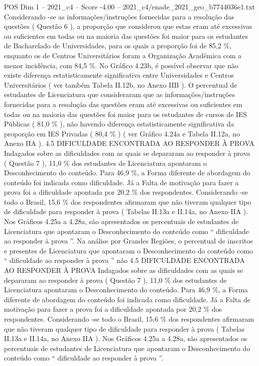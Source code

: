 \begin{textsample}{POS Dim 1 – 2021\_c4 – Score -4.00 – 2021\_c4/enade\_2021\_geo\_b7744036e1.txt}
Considerando -se as informações/instruções fornecidas para a resolução das questões ( Questão 6 ), a proporção que considerou que estas eram até excessivas ou suficientes em todas ou na maioria das questões foi maior para os estudantes de Bacharelado de Universidades, para os quais a proporção foi de 85,2 \%, enquanto os de Centros Universitários foram a Organização Acadêmica com a menor incidência, com 84,5 \%.
No Gráfico 4.23b, é possível observar que não existe diferença estatisticamente significativa entre Universidades e Centros Universitários ( ver também Tabela II.12b, no Anexo IIB ).
O percentual de estudantes de Licenciatura que consideraram que as informações/instruções fornecidas para a resolução das questões eram até excessivas ou suficientes em todas ou na maioria das questões foi maior para os estudantes de cursos de IES Públicas ( 81,0 \% ), não havendo diferença estatisticamente significativa da proporção em IES Privadas ( 80,4 \% ) ( ver Gráfico 4.24a e Tabela II.12a, no Anexo IIA ). 4.5 DIFICULDADE ENCONTRADA AO RESPONDER À PROVA Indagados sobre as dificuldades com as quais se depararam ao responder à prova ( Questão 7 ), 11,0 \% dos estudantes de Licenciatura apontaram o Desconhecimento do conteúdo.
Para 46,9 \%, a Forma diferente de abordagem do conteúdo foi indicada como dificuldade.
Já a Falta de motivação para fazer a prova foi a dificuldade apontada por 20,2 \% dos respondentes.
Considerando -se todo o Brasil, 15,6 \% dos respondentes afirmaram que não tiveram qualquer tipo de dificuldade para responder à prova ( Tabelas II.13a e II.14a, no Anexo IIA ).
Nos Gráficos 4.25a a 4.28a, são apresentados os percentuais de estudantes de Licenciatura que apontaram o Desconhecimento do conteúdo como “ dificuldade ao responder à prova ”.
Na análise por Grandes Regiões, o percentual de inscritos e presentes de Licenciatura que apontaram o Desconhecimento do conteúdo como “ dificuldade ao responder à prova ” não 4.5 DIFICULDADE ENCONTRADA AO RESPONDER À PROVA Indagados sobre as dificuldades com as quais se depararam ao responder à prova ( Questão 7 ), 11,0 \% dos estudantes de Licenciatura apontaram o Desconhecimento do conteúdo.
Para 46,9 \%, a Forma diferente de abordagem do conteúdo foi indicada como dificuldade.
Já a Falta de motivação para fazer a prova foi a dificuldade apontada por 20,2 \% dos respondentes.
Considerando -se todo o Brasil, 15,6 \% dos respondentes afirmaram que não tiveram qualquer tipo de dificuldade para responder à prova ( Tabelas II.13a e II.14a, no Anexo IIA ).
Nos Gráficos 4.25a a 4.28a, são apresentados os percentuais de estudantes de Licenciatura que apontaram o Desconhecimento do conteúdo como “ dificuldade ao responder à prova ”.

\end{textsample}
